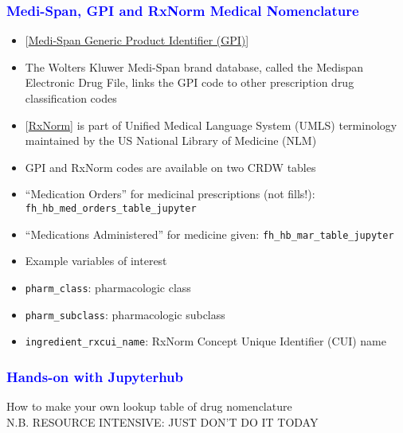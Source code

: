 \documentclass[11pt,pdftex,dvipsnames,usenames]{beamer}
\begin{document}
\begin{frame}[fragile]\frametitle{\bf\textcolor{blue}{Medi-Span, GPI and RxNorm
Medical Nomenclature}}
\begin{itemize}
\item \textcolor{PineGreen}{[\href{https://www.wolterskluwer.com/en/solutions/medi-span/about/gpi}
{Medi-Span Generic Product Identifier (GPI)}]}
\item The Wolters Kluwer Medi-Span brand database, called the Medispan
  Electronic Drug File, links the GPI code to other prescription drug
  classification codes
\item \textcolor{PineGreen}{[\href{https://www.nlm.nih.gov/research/umls/rxnorm/index.html}{RxNorm}]} is part of Unified Medical Language System (UMLS)
  terminology maintained by the US National Library
  of Medicine (NLM)
\item GPI and RxNorm codes are available on two CRDW tables
\item ``Medication Orders'' for medicinal prescriptions (not fills!): \texttt{fh\_hb\_med\_orders\_table\_jupyter}
\item ``Medications Administered'' for medicine given: \texttt{fh\_hb\_mar\_table\_jupyter} 
\item Example variables of interest
\item \texttt{pharm\_class}: pharmacologic class
\item \texttt{pharm\_subclass}: pharmacologic subclass
\item \texttt{ingredient\_rxcui\_name}: RxNorm Concept Unique Identifier (CUI) name
\end{itemize}
\end{frame}

\begin{frame}[fragile]\frametitle{\bf\textcolor{blue}{Hands-on with Jupyterhub}}
How to make your own lookup table of drug nomenclature\\ 
N.B. RESOURCE INTENSIVE: JUST DON'T DO IT TODAY

\end{frame}
\end{document}
